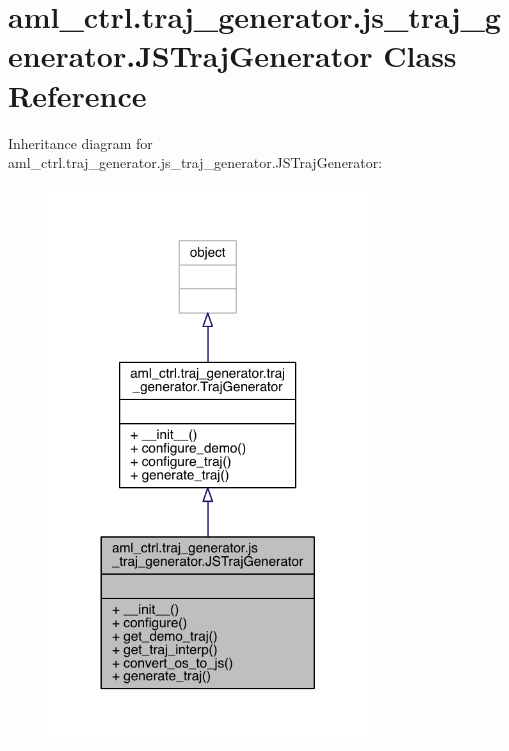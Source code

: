 \hypertarget{classaml__ctrl_1_1traj__generator_1_1js__traj__generator_1_1_j_s_traj_generator}{}\section{aml\+\_\+ctrl.\+traj\+\_\+generator.\+js\+\_\+traj\+\_\+generator.\+J\+S\+Traj\+Generator Class Reference}
\label{classaml__ctrl_1_1traj__generator_1_1js__traj__generator_1_1_j_s_traj_generator}


Inheritance diagram for aml\+\_\+ctrl.\+traj\+\_\+generator.\+js\+\_\+traj\+\_\+generator.\+J\+S\+Traj\+Generator\+:\nopagebreak
\begin{figure}[H]
\begin{center}
\leavevmode
\includegraphics[width=240pt]{classaml__ctrl_1_1traj__generator_1_1js__traj__generator_1_1_j_s_traj_generator__inherit__graph}
\end{center}
\end{figure}


